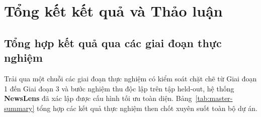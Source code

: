 \section{Tổng kết kết quả và Thảo luận}
\label{sec:results-summary-discussion}

\subsection{Tổng hợp kết quả qua các giai đoạn thực nghiệm}

Trải qua một chuỗi các giai đoạn thực nghiệm có kiểm soát chặt chẽ từ Giai đoạn 1 đến Giai đoạn 3 và bước nghiệm thu độc lập trên tập held-out, hệ thống \textbf{NewsLens} đã xác lập được cấu hình tối ưu toàn diện. Bảng~\ref{tab:master-summary} tổng hợp các kết quả thực nghiệm then chốt xuyên suốt toàn bộ dự án.

